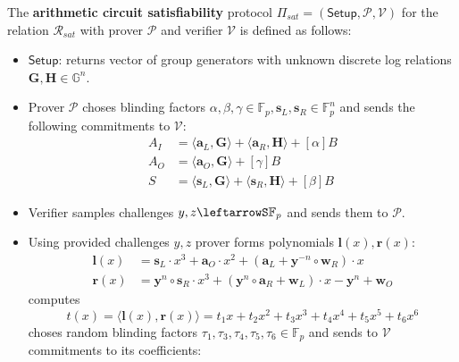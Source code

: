 \documentclass[../lecture-notes-148x210.tex]{subfiles}
\begin{document}
\begin{definition}
    The \textbf{arithmetic circuit satisfiability} protocol $\Pi_{sat} = (\mathsf{Setup}, \mathcal{P}, \mathcal{V})$ for the relation $\mathcal{R}_{sat}$ with prover $\mathcal{P}$ and verifier $\mathcal{V}$ is defined as follows:
    \begin{itemize}
        \item $\mathsf{Setup}$: returns vector of group generators with unknown discrete log relations $\mathbf{G,H} \in \mathbb{G}^n$.
        \item Prover $\mathcal{P}$ choses blinding factors $\alpha, \beta, \gamma \in \mathbb{F}_p, \mathbf{s}_L, \mathbf{s}_R \in \mathbb{F}_p^n$ and sends the following commitments to $\mathcal{V}$:
        \begin{equation*}
            \begin{aligned}
                A_I &= \langle \mathbf{a}_L, \mathbf{G} \rangle + \langle \mathbf{a}_R, \mathbf{H} \rangle + [\alpha]B\\
                A_O &= \langle \mathbf{a}_O, \mathbf{G} \rangle + [\gamma]B\\
                S &= \langle \mathbf{s}_L, \mathbf{G} \rangle + \langle \mathbf{s}_R, \mathbf{H} \rangle + [\beta]B
            \end{aligned}
        \end{equation*}
        \item Verifier samples challenges $y,z \leftarrowS \mathbb{F}_p$ and sends them to $\mathcal{P}$.
        \item Using provided challenges $y,z$ prover forms polynomials $\mathbf{l}(x), \mathbf{r}(x)$:
        \begin{equation*}
            \begin{aligned}
                \mathbf{l}(x) &= \mathbf{s}_L \cdot x^3 + \mathbf{a}_O \cdot x^2 + (\mathbf{a}_L + \mathbf{y}^{-n} \circ \mathbf{w}_R) \cdot x \\
                \mathbf{r}(x) &= \mathbf{y}^n \circ \mathbf{s}_R \cdot x^3 + (\mathbf{y}^n \circ \mathbf{a}_R +  \mathbf{w}_L) \cdot x - \mathbf{y}^n + \mathbf{w}_O
            \end{aligned}
        \end{equation*}
        computes $$t(x) = \langle \mathbf{l}(x), \mathbf{r}(x) \rangle = t_1 x + t_2 x^2 + t_3 x^3 + t_4 x^4 + t_5 x^5 + t_6 x^6$$
        choses random blinding factors $\tau_1, \tau_3, \tau_4, \tau_5, \tau_6 \in \mathbb{F}_p$ and sends to $\mathcal{V}$ commitments to its coefficients:

\end{itemize}
\end{definition}
\end{document}
